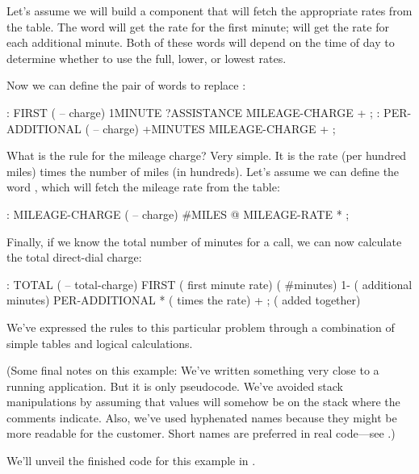 Let's assume we will build a component that will fetch the appropriate
rates from the table. The word  will get the rate for
the first minute;  will get the rate for each
additional minute.  Both of these words will depend on the time of day
to determine whether to use the full, lower, or lowest rates.

Now we can define the pair of words to replace :


\begin{Code}
: FIRST  ( -- charge)
  1MINUTE  ?ASSISTANCE   MILEAGE-CHARGE + ;
: PER-ADDITIONAL  ( -- charge)
   +MINUTES  MILEAGE-CHARGE + ;
\end{Code}
What is the rule for the mileage charge? Very simple. It is the rate
(per hundred miles) times the number of miles (in hundreds). Let's
assume we can define the word , which will fetch
the mileage rate from the table:

\begin{Code}
: MILEAGE-CHARGE  ( -- charge)
   #MILES @  MILEAGE-RATE * ;
\end{Code}
Finally, if we know the total number of minutes for a call, we can now
calculate the total direct-dial charge:

\begin{Code}
: TOTAL   ( -- total-charge)
   FIRST                        ( first minute rate)
   ( #minutes) 1-               ( additional minutes)
      PER-ADDITIONAL *          ( times the rate)
   +  ;                         ( added together)
\end{Code}
We've expressed the rules to this particular problem through a
combination of simple tables and logical calculations.

(Some final notes on this example: We've written something very close
to a running \Forth{} application. But it is only pseudocode. We've
avoided stack manipulations by assuming that values will somehow be on
the stack where the comments indicate. Also, we've used hyphenated
names because they might be more readable for the customer. Short
names are preferred in real code---see .)

We'll unveil the finished code for this example in .%
%
%
%
%

